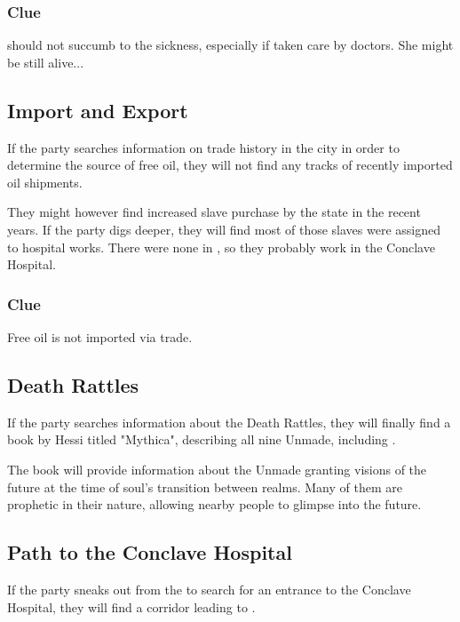 
\subsubsection{Clue}

\npcOrphanSick{} should not succumb to the sickness, especially if taken care by doctors. She might be still alive...




\subsection{Import and Export}
\label{ssec:palanaeumImport}

If the party searches information on trade history in the city in order to determine the source of free oil, they will not find any tracks of recently imported oil shipments. 

They might however find increased slave purchase by the state in the recent years. If the party digs deeper, they will find most of those slaves were assigned to hospital works. There were none in , so they probably work in the Conclave Hospital.

\subsubsection{Clue}

Free oil is not imported via trade.



\subsection{Death Rattles}
\label{ssec:palanaeumDeathRattles}

If the party searches information about the Death Rattles, they will finally find a book by Hessi titled "Mythica", describing all nine Unmade, including \npcMoelach{}.

The book will provide information about the Unmade granting visions of the future at the time of soul's transition between realms. Many of them are prophetic in their nature, allowing nearby people to glimpse into the future.




\subsection{Path to the Conclave Hospital}

If the party sneaks out from the \locationPalanaeum{} to search for an entrance to the Conclave Hospital, they will find a corridor leading to .
